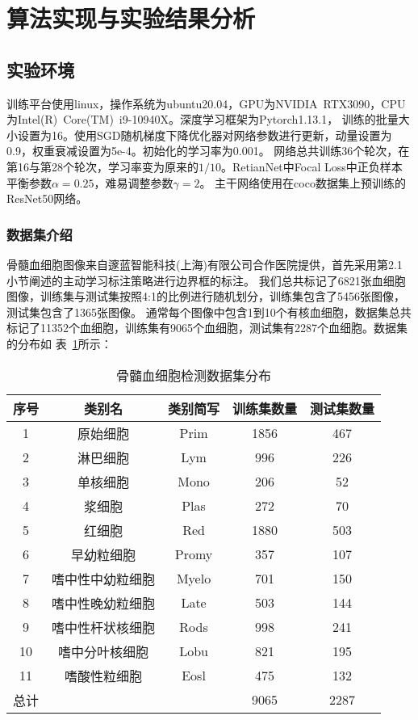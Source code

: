 \section{算法实现与实验结果分析}
\subsection{实验环境}
训练平台使用linux，操作系统为ubuntu20.04，GPU为NVIDIA$\enspace$RTX3090，CPU为Intel(R)$\enspace$Core(TM)$\enspace$i9-10940X。深度学习框架为Pytorch1.13.1，
训练的批量大小设置为16。使用SGD随机梯度下降优化器对网络参数进行更新，动量设置为0.9，权重衰减设置为5e-4。初始化的学习率为0.001。
网络总共训练36个轮次，在第16与第28个轮次，学习率变为原来的$1/10$。RetianNet中Focal Loss中正负样本平衡参数$\alpha=0.25$，难易调整参数$\gamma=2$。
主干网络使用在coco数据集上预训练的ResNet50网络。

\subsubsection{数据集介绍}
骨髓血细胞图像来自邃蓝智能科技(上海)有限公司合作医院提供，首先采用第2.1小节阐述的主动学习标注策略进行边界框的标注。
我们总共标记了6821张血细胞图像，训练集与测试集按照4:1的比例进行随机划分，训练集包含了5456张图像，测试集包含了1365张图像。
通常每个图像中包含1到10个有核血细胞，数据集总共标记了11352个血细胞，训练集有9065个血细胞，测试集有2287个血细胞。数据集的分布如
表~\ref{table:cell_detect1}所示：

\begin{table}[htbp]
  \caption{骨髓血细胞检测数据集分布}   
  \centering 
  \label{table:cell_detect1}
  \begin{tabular}{ccccc}
    \toprule[1pt]
    序号 & 类别名  &  类别简写 & 训练集数量 & 测试集数量 \\
    \midrule[1pt] 
    1 & 原始细胞 & Prim & 1856 & 467 \\ 
    2 & 淋巴细胞 & Lym & 996 & 226   \\ 
    3 & 单核细胞 & Mono & 206 & 52   \\ 
    4 & 浆细胞 & Plas & 272 & 70   \\ 
    5 & 红细胞 & Red & 1880 & 503   \\ 
    6 & 早幼粒细胞 & Promy & 357 & 107   \\ 
    7 & 嗜中性中幼粒细胞 & Myelo & 701 & 150   \\ 
    8 & 嗜中性晚幼粒细胞 & Late & 503 & 144   \\ 
    9 & 嗜中性杆状核细胞 & Rods & 998 & 241   \\  
    10 & 嗜中分叶核细胞 & Lobu & 821 & 195   \\  
    11 & 嗜酸性粒细胞 & Eosl & 475 & 132   \\  
    \hline
    总计 &   &   & 9065 & 2287 \\
    \bottomrule[1pt]      
  \end{tabular} 
\end{table}

